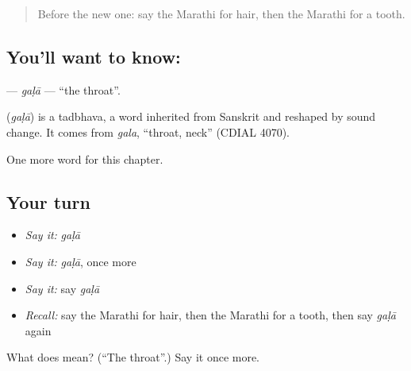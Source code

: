 \begin{quote}
Before the new one: say the Marathi for hair, then the Marathi for a tooth.
\end{quote}

\subsection*{You'll want to know: }
\textbf{} — \emph{gaḷā} — \textquotedblleft{}the throat\textquotedblright{}.

\begin{cousinweb}
\textbf{} (\emph{gaḷā}) is a tadbhava, a word inherited from Sanskrit and reshaped by sound change. It comes from \emph{gala}, \textquotedblleft{}throat, neck\textquotedblright{} (CDIAL 4070).
\end{cousinweb}

\begin{grammarlens}[title={What you've built}]
One more word for this chapter.
\end{grammarlens}

\subsection*{Your turn}
\begin{itemize}
\raggedright
  \item \emph{Say it:} \emph{gaḷā}
  \item \emph{Say it:} \emph{gaḷā}, once more
  \item \emph{Say it:} say \emph{gaḷā}
  \item \emph{Recall:} say the Marathi for hair, then the Marathi for a tooth, then say \emph{gaḷā} again
\end{itemize}

\begin{tcolorbox}[breakable,colback=teal!4,colframe=teal!35!black,title={Before you move on}]
What does  mean? (\textquotedblleft{}The throat\textquotedblright{}.) Say it once more.
\end{tcolorbox}
